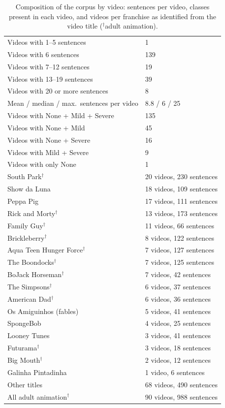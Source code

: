 \begin{table}[!t]
\centering
\small
\caption{Composition of the corpus by video: sentences per video, classes present in each video, and videos per franchise as identified from the video title ($^\dagger$adult animation).}
\label{tab:videos}
\begin{tabular}{p{}p{}}
\toprule
Videos with 1--5 sentences & 1 \\
Videos with 6 sentences & 139 \\
Videos with 7--12 sentences & 19 \\
Videos with 13--19 sentences & 39 \\
Videos with 20 or more sentences & 8 \\
Mean / median / max.\ sentences per video & 8.8 / 6 / 25 \\
\midrule
Videos with None + Mild + Severe & 135 \\
Videos with None + Mild & 45 \\
Videos with None + Severe & 16 \\
Videos with Mild + Severe & 9 \\
Videos with only None & 1 \\
\midrule
South Park$^\dagger$ & 20 videos, 230 sentences \\
Show da Luna & 18 videos, 109 sentences \\
Peppa Pig & 17 videos, 111 sentences \\
Rick and Morty$^\dagger$ & 13 videos, 173 sentences \\
Family Guy$^\dagger$ & 11 videos, 66 sentences \\
Brickleberry$^\dagger$ & 8 videos, 122 sentences \\
Aqua Teen Hunger Force$^\dagger$ & 7 videos, 127 sentences \\
The Boondocks$^\dagger$ & 7 videos, 125 sentences \\
BoJack Horseman$^\dagger$ & 7 videos, 42 sentences \\
The Simpsons$^\dagger$ & 6 videos, 37 sentences \\
American Dad$^\dagger$ & 6 videos, 36 sentences \\
Os Amiguinhos (fables) & 5 videos, 41 sentences \\
SpongeBob & 4 videos, 25 sentences \\
Looney Tunes & 3 videos, 41 sentences \\
Futurama$^\dagger$ & 3 videos, 18 sentences \\
Big Mouth$^\dagger$ & 2 videos, 12 sentences \\
Galinha Pintadinha & 1 video, 6 sentences \\
Other titles & 68 videos, 490 sentences \\
\midrule
All adult animation$^\dagger$ & 90 videos, 988 sentences \\
\bottomrule
\end{tabular}
\end{table}
